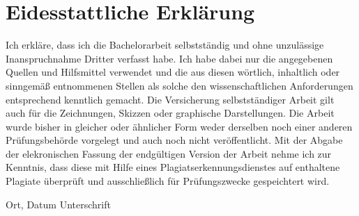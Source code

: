 \documentclass[oneside,12pt,a4paper]{report}
\begin{document}
\cleardoublepage


\chapter*{ Eidesstattliche Erklärung}

\noindent
Ich erkläre, dass ich die Bachelorarbeit selbstständig und ohne unzulässige Inanspruchnahme Dritter verfasst habe. Ich habe dabei nur die angegebenen Quellen und Hilfsmittel verwendet und die aus diesen wörtlich, inhaltlich oder sinngemäß entnommenen Stellen als solche den wissenschaftlichen Anforderungen entsprechend kenntlich gemacht. Die Versicherung selbstständiger Arbeit gilt auch für die Zeichnungen, Skizzen oder graphische Darstellungen. Die Arbeit wurde bisher in gleicher oder ähnlicher Form weder derselben noch einer anderen Prüfungsbehörde vorgelegt und auch noch nicht veröffentlicht. Mit der Abgabe der elekronischen Fassung der endgültigen Version der Arbeit nehme ich zur Kenntnis, dass diese mit Hilfe eines Plagiatserkennungsdienstes auf enthaltene Plagiate überprüft und ausschließlich für Prüfungszwecke gespeichtert wird.

\vskip 2cm

Ort, Datum	\hfill Unterschrift \hfill 
\end{document}
